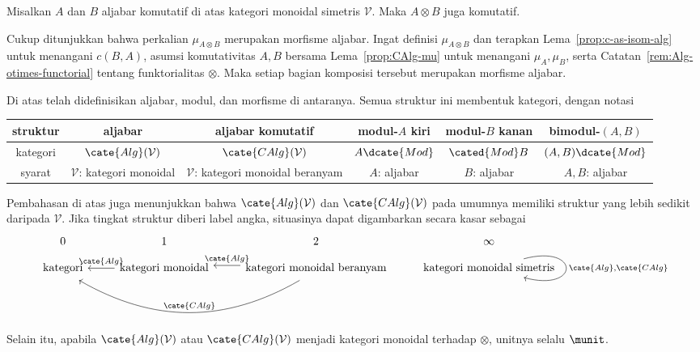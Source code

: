 \begin{proposisi}
	Misalkan $A$ dan $B$ aljabar komutatif di atas kategori monoidal simetris
	$\mathcal{V}$. Maka $A\otimes B$ juga komutatif.
\end{proposisi}
\begin{bukti}
	Cukup ditunjukkan bahwa perkalian $\mu_{A\otimes B}$ merupakan morfisme
	aljabar. Ingat definisi $\mu_{A\otimes B}$ dan terapkan
	Lema~\ref{prop:c-as-isom-alg} untuk menangani $c(B,A)$, asumsi komutativitas
	$A,B$ bersama Lema~\ref{prop:CAlg-mu} untuk menangani $\mu_A,\mu_B$, serta
	Catatan~\ref{rem:Alg-otimes-functorial} tentang funktorialitas $\otimes$.
	Maka setiap bagian komposisi tersebut merupakan morfisme aljabar.
\end{bukti}

Di atas telah didefinisikan aljabar, modul, dan morfisme di antaranya. Semua
struktur ini membentuk kategori, dengan notasi
\begin{center}\begin{tabular}{|c|c|c|c|c|c|} \hline
	struktur & aljabar & aljabar komutatif & modul-$A$ kiri & modul-$B$ kanan & bimodul-$(A,B)$ \\ \hline
	kategori & $\cate{Alg}(\mathcal{V})$ & $\cate{CAlg}(\mathcal{V})$ & $A\dcate{Mod}$ & $\cated{Mod}B$ & $(A,B)\dcate{Mod}$ \\ \hline
	syarat & {\small $\mathcal{V}$: kategori monoidal} & {\small $\mathcal{V}$: kategori monoidal beranyam} & {\small $A$: aljabar} & {\small $B$: aljabar} & {\small $A, B$: aljabar} \\ \hline
\end{tabular}\end{center}

Pembahasan di atas juga menunjukkan bahwa
$\cate{Alg}(\mathcal{V})$ dan $\cate{CAlg}(\mathcal{V})$ pada umumnya
memiliki struktur yang lebih sedikit daripada $\mathcal{V}$. Jika tingkat struktur diberi label
angka, situasinya dapat digambarkan secara kasar sebagai
\[\begin{tikzcd}[row sep=small]
	0 & 1 & 2 & \infty \\
	\text{kategori} & \text{kategori monoidal} \arrow[l, "{\cate{Alg}}"'] & \text{kategori monoidal beranyam} \arrow[shift right, l, "{\cate{Alg}}"'] \arrow[shift left, bend left, ll, "{\cate{CAlg}}"'] & \text{kategori monoidal simetris} \arrow[loop right, "{\cate{Alg}, \cate{CAlg}}"]
\end{tikzcd}\]
Selain itu, apabila $\cate{Alg}(\mathcal{V})$ atau
$\cate{CAlg}(\mathcal{V})$ menjadi kategori monoidal terhadap $\otimes$,
unitnya selalu $\munit$.

